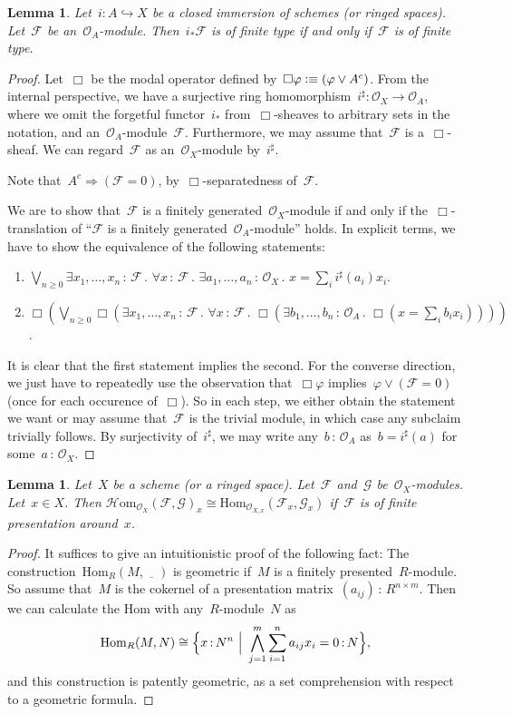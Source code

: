 \documentclass[10pt]{amsart}
\theoremstyle{definition}
\theoremstyle{plain}
\newtheorem{lemma}[defn]{Lemma}
\theoremstyle{remark}
\newcommand{\F}{\mathcal{F}}
\renewcommand{\G}{\mathcal{G}}
\renewcommand{\O}{\mathcal{O}}
\newcommand{\Hom}{\mathrm{Hom}}
\newcommand{\HOM}{\mathcal{H}\mathrm{om}}
\newcommand{\placeholder}{\underline{\quad}}
\newcommand{\?}{\,{:}\,}
\renewcommand{\_}{\mathpunct{.}\,}
\newcommand{\defequiv}{\vcentcolon\equiv}
\begin{document}
\begin{lemma}\label{lemma:pushforward-finite-type}
Let~$i : A \hookrightarrow X$ be a closed immersion of schemes (or
ringed spaces). Let~$\F$ be an~$\O_A$-module. Then~$i_*\F$ is of finite type if
and only if~$\F$ is of finite type.\end{lemma}
\begin{proof}
Let~$\Box$ be the modal operator defined by~$\Box\varphi \defequiv (\varphi \vee
A^c)$. From the internal perspective, we have a surjective ring homomorphism~$i^\sharp
: \O_X \to \O_A$, where we omit the forgetful functor~$i_*$ from~$\Box$-sheaves
to arbitrary sets in the notation, and an~$\O_A$-module~$\F$. Furthermore, we
may assume that~$\F$ is a~$\Box$-sheaf. We can regard~$\F$ as an~$\O_X$-module
by~$i^\sharp$.

Note that~$A^c \Rightarrow (\F = 0)$, by~$\Box$-separatedness of~$\F$.

We are to show that~$\F$ is a finitely generated~$\O_X$-module if and only if
the~$\Box$-translation of ``$\F$ is a finitely generated~$\O_A$-module'' holds.
In explicit terms, we have to show the equivalence of the following statements:
\begin{enumerate}
\item $\bigvee_{n \geq 0} \exists x_1,\ldots,x_n\?\F\_
  \forall x\?\F\_ \exists a_1,\ldots,a_n\?\O_X\_ x = \sum_i i^\sharp(a_i) x_i$.
\item $\Box(\bigvee_{n \geq 0} \Box(\exists x_1,\ldots,x_n\?\F\_
  \forall x\?\F\_ \Box(\exists b_1,\ldots,b_n\?\O_A\_ \Box(
    x = \sum_i b_i x_i))))$.
\end{enumerate}
It is clear that the first statement implies the second. For the converse
direction, we just have to repeatedly use the observation that~$\Box\varphi$
implies~$\varphi \vee (\F = 0)$ (once for each occurence of~$\Box$). So in each
step, we either obtain the statement we want or may assume
that~$\F$ is the trivial module, in which case any subclaim trivially follows. By
surjectivity of~$i^\sharp$, we may write any~$b\?\O_A$ as~$b =
i^\sharp(a)$ for some~$a\?\O_X$.
\end{proof}

\begin{lemma}Let~$X$ be a scheme (or a ringed space). Let~$\F$ and~$\G$ be~$\O_X$-modules. Let~$x
\in X$. Then $\HOM_{\O_X}(\F,\G)_x \cong \Hom_{\O_{X,x}}(\F_x,\G_x)$ if~$\F$ is
of finite presentation around~$x$.\end{lemma}
\begin{proof}It suffices to give an intuitionistic proof of the following fact:
The construction~$\Hom_R(M,\placeholder)$ is geometric if~$M$ is a finitely
presented~$R$-module. So assume that~$M$ is the cokernel of a presentation
matrix~$(a_{ij}) \? R^{n \times m}$. Then we can calculate the Hom with
any~$R$-module~$N$ as
\[ \Hom_R(M,N) \cong \Bigl\{ x \? N^n \ \Big|\ \bigwedge_{j=1}^m \sum_{i=1}^n a_{ij}
x_i = 0 \? N \Bigr\}, \]
and this construction is patently geometric, as a set comprehension with respect to
a geometric formula.
\end{proof}
\end{document}
